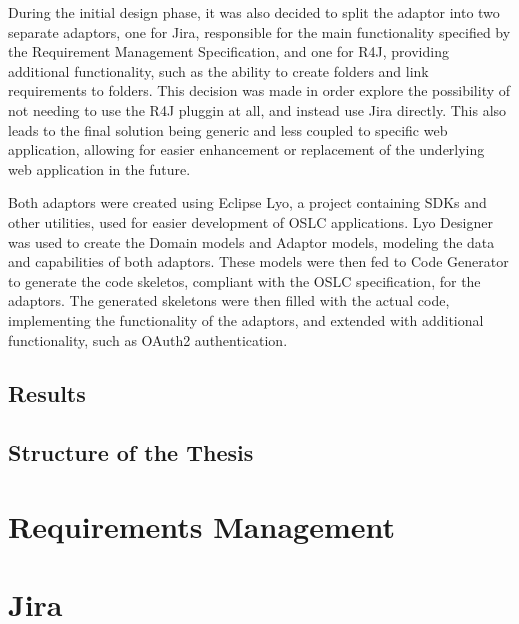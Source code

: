 During the initial design phase, it was also decided to split the adaptor into two separate adaptors, one for Jira, responsible for the main functionality specified by the Requirement Management Specification, and one for R4J, providing additional functionality, such as the ability to create folders and link requirements to folders. This decision was made in order explore the possibility of not needing to use the R4J pluggin at all, and instead use Jira directly. This also leads to the final solution being generic and less coupled to specific web application, allowing for easier enhancement or replacement of the underlying web application in the future.

Both adaptors were created using Eclipse Lyo, a project containing SDKs and other utilities, used for easier development of OSLC applications. Lyo Designer was used to create the Domain models and Adaptor models, modeling the data and capabilities of both adaptors. These models were then fed to Code Generator to generate the code skeletos, compliant with the OSLC specification, for the adaptors. The generated skeletons were then filled with the actual code, implementing the functionality of the adaptors, and extended with additional functionality, such as OAuth2 authentication.

\section{Results}

\section{Structure of the Thesis}


\chapter{Requirements Management}


\chapter{Jira}

